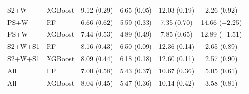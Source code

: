 \documentclass[
  english,
  review,
  number,
  sort,compress,
  authoryear,
  3p]{elsarticle}
\begin{document}
\begin{table}[htbp]
\begin{tabular}{l l c c c c}
S2+W & XGBoost & 9.12 (0.29) & 6.65 (0.05) & 12.03 (0.19) & 2.26 (0.92) \\
PS+W & RF & 6.66 (0.62) & 5.59 (0.33) & 7.35 (0.70) & 14.66 ($-$2.25) \\
PS+W & XGBoost & 7.44 (0.53) & 4.89 (0.49) & 7.85 (0.65) & 12.89 ($-$1.51) \\
S2+W+S1 & RF & 8.16 (0.43) & 6.50 (0.09) & 12.36 (0.14) & 2.65 (0.89) \\
S2+W+S1 & XGBoost & 8.09 (0.44) & 6.18 (0.18) & 12.60 (0.11) & 2.57 (0.90) \\
All & RF & 7.00 (0.58) & 5.43 (0.37) & 10.67 (0.36) & 5.05 (0.61) \\
All & XGBoost & 8.04 (0.45) & 5.47 (0.36) & 10.14 (0.42) & 3.58 (0.81) \\
\bottomrule
\end{tabular}
\end{table}



\end{document}
